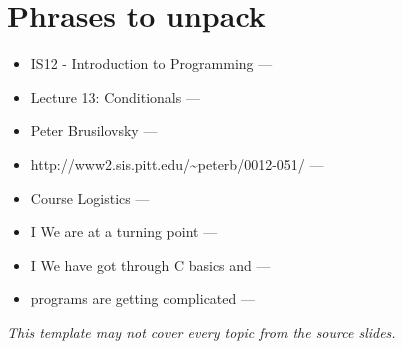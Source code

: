 \documentclass[14pt]{extarticle}
\begin{document}
\section*{Phrases to unpack}
\begin{itemize}[leftmargin=*]
  \item IS12 - Introduction to Programming --- \hrulefill
  \vspace{1.1em}
  \item Lecture 13: Conditionals --- \hrulefill
  \vspace{1.1em}
  \item Peter Brusilovsky --- \hrulefill
  \vspace{1.1em}
  \item http://www2.sis.pitt.edu/\textasciitilde{}peterb/0012-051/ --- \hrulefill
  \vspace{1.1em}
  \item Course Logistics --- \hrulefill
  \vspace{1.1em}
  \item I We are at a turning point --- \hrulefill
  \vspace{1.1em}
  \item I We have got through C basics and --- \hrulefill
  \vspace{1.1em}
  \item programs are getting complicated --- \hrulefill
  \vspace{1.1em}
\end{itemize}
\vspace{2em}
\begin{center}
\textit{This template may not cover every topic from the source slides.}
\end{center}
\end{document}
